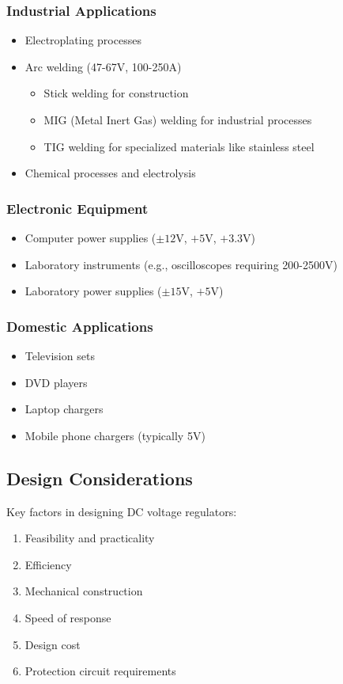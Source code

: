 \documentclass[a4paper,9pt,twoside,openany,twocolumn]{memoir}
\begin{document}
\subsubsection{Industrial Applications}
\begin{itemize}
    \item Electroplating processes
    \item Arc welding (47-67V, 100-250A)
    \begin{itemize}
        \item Stick welding for construction
        \item MIG (Metal Inert Gas) welding for industrial processes
        \item TIG welding for specialized materials like stainless steel
    \end{itemize}
    \item Chemical processes and electrolysis
\end{itemize}

\subsubsection{Electronic Equipment}
\begin{itemize}
    \item Computer power supplies ($\pm12$V, $+5$V, $+3.3$V)
    \item Laboratory instruments (e.g., oscilloscopes requiring 200-2500V)
    \item Laboratory power supplies ($\pm15$V, $+5$V)
\end{itemize}

\subsubsection{Domestic Applications}
\begin{itemize}
    \item Television sets
    \item DVD players
    \item Laptop chargers
    \item Mobile phone chargers (typically 5V)
\end{itemize}

\subsection{Design Considerations}
Key factors in designing DC voltage regulators:
\begin{enumerate}
    \item Feasibility and practicality
    \item Efficiency
    \item Mechanical construction
    \item Speed of response
    \item Design cost
    \item Protection circuit requirements
\end{enumerate}
\end{document}
